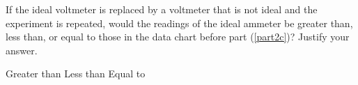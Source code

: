 \documentclass{../../oss-apphys-exam}
\begin{document}
\begin{questions}
\begin{parts}
\begin{subparts}
      \subpart If the ideal voltmeter is replaced by a voltmeter that is not
      ideal and the experiment is repeated, would the readings of the ideal
      ammeter be greater than, less than, or equal to those in the data chart
      before part (\ref{part2c})? Justify your answer.

      \vspace{.05in}
      \underline{\hspace{.4in}} Greater than\hspace{.5in}
      \underline{\hspace{.4in}} Less than\hspace{.5in}
      \underline{\hspace{.4in}} Equal to
      \vspace{.7in}
    \end{subparts}
  \end{parts}
\end{questions}
\end{document}
